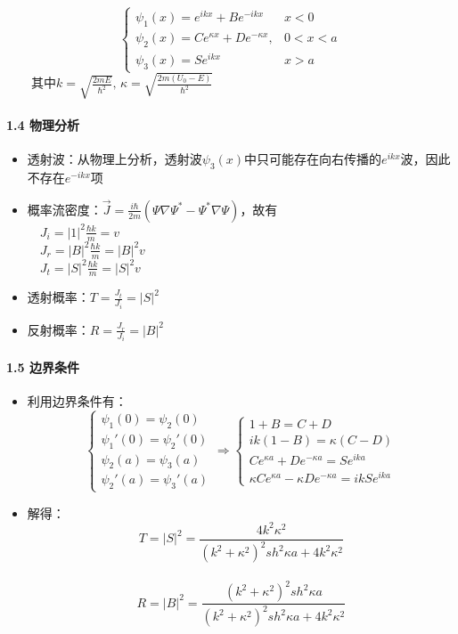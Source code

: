 \documentclass[UTF8,twocolumn]{ctexart}
\providecommand{\tightlist}{%
  \setlength{\itemsep}{0pt}\setlength{\parskip}{0pt}}
\let\oldparagraph\paragraph
\renewcommand{\paragraph}[1]{\oldparagraph{#1}\mbox{}}
\begin{document}
\[\begin{cases} 
        \psi_1(x)=e^{ikx}+Be^{-ikx} & x<0\\
        \psi_2(x)=Ce^{\kappa x}+De^{-\kappa x}, & 0<x<a\\
        \psi_3(x)=Se^{ikx} & x>a
\end{cases}\]
  其中\(k=\sqrt{\frac{2mE}{\hbar^2}},\,\kappa=\sqrt{\frac{2m(U_0-E)}{\hbar^2}}\)

\hypertarget{ux7269ux7406ux5206ux6790-1}{%
\paragraph{{ }1.4 物理分析}\label{ux7269ux7406ux5206ux6790-1}}

\begin{itemize}
\tightlist
\item
  透射波：从物理上分析，透射波\(\psi_3(x)\)中只可能存在向右传播的\(e^{ikx}\)波，因此不存在\(e^{-ikx}\)项
\item
  概率流密度：\(\vec{J}=\frac{i\hbar}{2m}(\Psi\nabla\Psi^* -\Psi^*\nabla\Psi)\)，故有\\
   \(J_i=|1|^2\frac{\hbar k}{m}=v\)\\
   \(J_r=|B|^2\frac{\hbar k}{m}=|B|^2v\)\\
   \(J_t=|S|^2\frac{\hbar k}{m}=|S|^2v\)
\item
  透射概率：\(T=\frac{J_t}{J_i}=|S|^2\)
\item
  反射概率：\(R=\frac{J_r}{J_i}=|B|^2\)
\end{itemize}

\hypertarget{ux8fb9ux754cux6761ux4ef6-2}{%
\paragraph{{ }1.5 边界条件}\label{ux8fb9ux754cux6761ux4ef6-2}}

\begin{itemize}
\tightlist
\item
  利用边界条件有： \[\begin{cases} 
        \psi_1(0)=\psi_2(0)\\
        \psi_1'(0)=\psi_2'(0)\\
        \psi_2(a)=\psi_3(a)\\
        \psi_2'(a)=\psi_3'(a)
  \end{cases}\Rightarrow
  \begin{cases} 
        1+B=C+D\\
        ik(1-B)=\kappa(C-D)\\
        Ce^{\kappa a}+De^{-\kappa a}=Se^{ika}\\
        \kappa Ce^{\kappa a}-\kappa De^{-\kappa a}=ikSe^{ika}
  \end{cases}\]
\item
  解得：
  \[T=|S|^2=\frac{4k^2\kappa^2}{(k^2+\kappa^2)^2sh^2\kappa a+4k^2\kappa^2}\]\\
  \[R=|B|^2=\frac{(k^2+\kappa^2)^2sh^2\kappa a}{(k^2+\kappa^2)^2sh^2\kappa a+4k^2\kappa^2}\]
\end{itemize}
\end{document}
